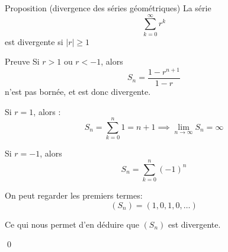 \documentclass[a4paper]{article}
\begin{document}
\begin{parag}{Proposition (divergence des séries géométriques)}
    La série 
    \[\sum_{k=0}^{\infty} r^{k} \]
    est divergente si $\left|r\right| \geq 1$

    \begin{subparag}{Preuve}
        Si $r > 1$ ou $r < -1$, alors 
        \[S_n = \frac{1 - r^{n+1}}{1 - r}\]
        n'est pas bornée, et est donc divergente.

        Si $r = 1$, alors :
        \[S_n = \sum_{k=0}^{n} 1 = n+1 \implies \lim_{n \to \infty} S_n = \infty\]
        
        Si $r = -1$, alors 
        \[S_n = \sum_{k=0}^{n} \left(-1\right)^{n}\]
        
        On peut regarder les premiers termes: 
        \[\left(S_n\right) = \left(1, 0, 1, 0, \ldots\right)\]

        Ce qui nous permet d'en déduire que $\left(S_n\right)$ est divergente.

        \qed
    \end{subparag}
    
\end{parag}
\end{document}
